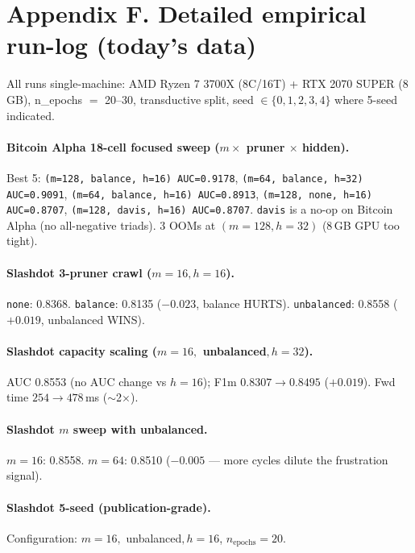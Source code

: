 \documentclass[11pt,a4paper]{article}
\newcommand{\code}[1]{\texttt{\small #1}}
\begin{document}
\section*{Appendix F. Detailed empirical run-log (today's data)}

All runs single-machine: AMD Ryzen 7 3700X (8C/16T) + RTX 2070
SUPER (8\,GB), n\_epochs $=$ 20--30, transductive split, seed
$\in \{0,1,2,3,4\}$ where 5-seed indicated.

\paragraph{Bitcoin Alpha 18-cell focused sweep ($m \times$ pruner $\times$ hidden).}
Best 5: \code{(m{=}128, balance, h{=}16) AUC=0.9178},
\code{(m{=}64, balance, h{=}32) AUC=0.9091},
\code{(m{=}64, balance, h{=}16) AUC=0.8913},
\code{(m{=}128, none, h{=}16) AUC=0.8707},
\code{(m{=}128, davis, h{=}16) AUC=0.8707}.
\code{davis} is a no-op on Bitcoin Alpha (no all-negative triads).
3 OOMs at $(m{=}128, h{=}32)$ (8\,GB GPU too tight).

\paragraph{Slashdot 3-pruner crawl ($m{=}16, h{=}16$).}
\code{none}: 0.8368.
\code{balance}: 0.8135 ($-0.023$, balance HURTS).
\code{unbalanced}: 0.8558 ($+0.019$, unbalanced WINS).

\paragraph{Slashdot capacity scaling ($m{=}16, $ unbalanced$, h{=}32$).}
AUC 0.8553 (no AUC change vs $h{=}16$); F1m $0.8307 \to 0.8495$
($+0.019$). Fwd time $254 \to 478$\,ms ($\sim$2$\times$).

\paragraph{Slashdot $m$ sweep with unbalanced.}
$m{=}16$: 0.8558. $m{=}64$: 0.8510 ($-0.005$ --- more cycles dilute
the frustration signal).

\paragraph{Slashdot 5-seed (publication-grade).}
Configuration: $m{=}16, $ unbalanced$, h{=}16$, $n_\text{epochs}{=}20$.
\end{document}
